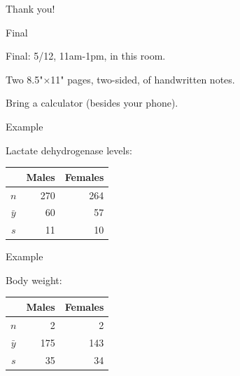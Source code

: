 \begin{frame}
    \vfill
    \centering
    {\Large
    Thank you!
    }
    \vfill
\end{frame}

\begin{frame}{Final}
  \begin{center}

      Final: 5/12, 11am-1pm, in this room.

    \vspace{2em}

      Two 8.5"$\times$11" pages, two-sided, of handwritten notes.

    \vspace{2em}

    Bring a calculator (besides your phone).

  \end{center}
\end{frame}




\begin{frame}{Example}

  Lactate dehydrogenase levels:
  \begin{center}
    \begin{tabular}{crr}
       & Males & Females \\
       \hline
       $n$ & 270 & 264 \\
       $\bar y$ & 60 & 57 \\
       $s$ & 11 & 10
     \end{tabular}

   \vspace{2em}

   \end{center}

\end{frame}



\begin{frame}{Example}

  Body weight:
  \begin{center}
    \begin{tabular}{crr}
       & Males & Females \\
       \hline
       $n$ & 2 & 2 \\
       $\bar y$ & 175 & 143 \\
       $s$ & 35 & 34
     \end{tabular}

   \vspace{2em}

   \end{center}

\end{frame}


